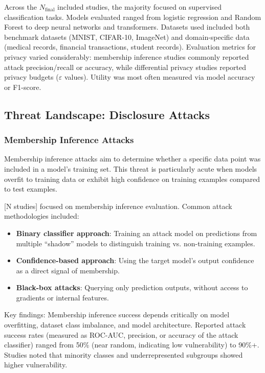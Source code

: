 \documentclass[11pt,a4paper]{article}
\begin{document}
Across the $N_{\text{final}}$ included studies, the majority focused on supervised classification tasks. Models evaluated ranged from logistic regression and Random Forest to deep neural networks and transformers. Datasets used included both benchmark datasets (MNIST, CIFAR-10, ImageNet) and domain-specific data (medical records, financial transactions, student records). Evaluation metrics for privacy varied considerably: membership inference studies commonly reported attack precision/recall or accuracy, while differential privacy studies reported privacy budgets ($\varepsilon$ values). Utility was most often measured via model accuracy or F1-score.

\subsection{Threat Landscape: Disclosure Attacks}

\subsubsection{Membership Inference Attacks}

Membership inference attacks aim to determine whether a specific data point was included in a model's training set. This threat is particularly acute when models overfit to training data or exhibit high confidence on training examples compared to test examples.

[N studies] focused on membership inference evaluation. Common attack methodologies included:

\begin{itemize}
\item \textbf{Binary classifier approach}: Training an attack model on predictions from multiple ``shadow'' models to distinguish training vs. non-training examples.
\item \textbf{Confidence-based approach}: Using the target model's output confidence as a direct signal of membership.
\item \textbf{Black-box attacks}: Querying only prediction outputs, without access to gradients or internal features.
\end{itemize}

Key findings: Membership inference success depends critically on model overfitting, dataset class imbalance, and model architecture. Reported attack success rates (measured as ROC-AUC, precision, or accuracy of the attack classifier) ranged from 50\% (near random, indicating low vulnerability) to 90\%+. Studies noted that minority classes and underrepresented subgroups showed higher vulnerability.
\end{document}
